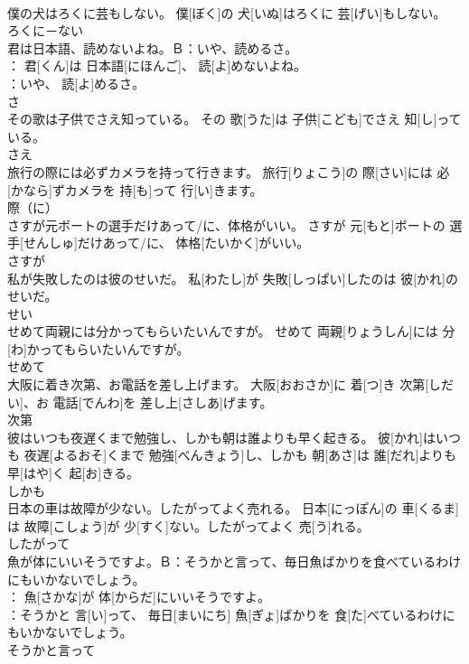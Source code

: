 \documentclass[8pt]{extreport}
\begin{document}
\begin{CJK}{UTF8}{min}
\\	僕の犬はろくに芸もしない。	僕[ぼく]の 犬[いぬ]はろくに 芸[げい]もしない。	
\\	ろくに－ない	
\\	君は日本語、読めないよね。Ｂ：いや、読めるさ。	
\\	[えい]： 君[くん]は 日本語[にほんご]、 読[よ]めないよね。 
\\	[びー]：いや、 読[よ]めるさ。	
\\	さ	
\\	その歌は子供でさえ知っている。	その 歌[うた]は 子供[こども]でさえ 知[し]っている。	
\\	さえ	
\\	旅行の際には必ずカメラを持って行きます。	旅行[りょこう]の 際[さい]には 必[かなら]ずカメラを 持[も]って 行[い]きます。	
\\	際（に）	
\\	さすが元ボートの選手だけ{あって/に}、体格がいい。	さすが 元[もと]ボートの 選手[せんしゅ]だけ{あって/に}、 体格[たいかく]がいい。	
\\	さすが	
\\	私が失敗したのは彼のせいだ。	私[わたし]が 失敗[しっぱい]したのは 彼[かれ]のせいだ。	
\\	せい	
\\	せめて両親には分かってもらいたいんですが。	せめて 両親[りょうしん]には 分[わ]かってもらいたいんですが。	
\\	せめて	
\\	大阪に着き次第、お電話を差し上げます。	大阪[おおさか]に 着[つ]き 次第[しだい]、お 電話[でんわ]を 差し上[さしあ]げます。	
\\	次第	
\\	彼はいつも夜遅くまで勉強し、しかも朝は誰よりも早く起きる。	彼[かれ]はいつも 夜遅[よるおそ]くまで 勉強[べんきょう]し、しかも 朝[あさ]は 誰[だれ]よりも 早[はや]く 起[お]きる。	
\\	しかも	
\\	日本の車は故障が少ない。したがってよく売れる。	日本[にっぽん]の 車[くるま]は 故障[こしょう]が 少[すく]ない。したがってよく 売[う]れる。	
\\	したがって	
\\	魚が体にいいそうですよ。Ｂ：そうかと言って、毎日魚ばかりを食べているわけにもいかないでしょう。	
\\	[えい]： 魚[さかな]が 体[からだ]にいいそうですよ。 
\\	[びー]：そうかと 言[い]って、 毎日[まいにち] 魚[ぎょ]ばかりを 食[た]べているわけにもいかないでしょう。	
\\	そうかと言って	

\end{CJK}
\end{document}
